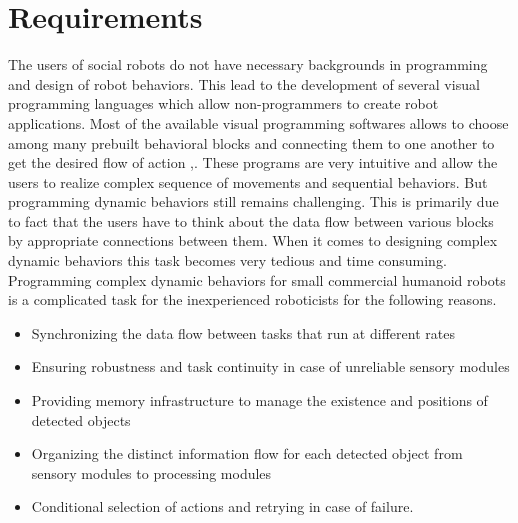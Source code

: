 {\section{Requirements}
The users of social robots do not have necessary backgrounds in programming and design of robot behaviors. This lead to the development of several visual programming languages which allow non-programmers to create robot applications. Most of the available visual programming softwares allows to choose among many prebuilt behavioral blocks and connecting them to one another to get the desired flow of action \cite{MSRS4},\cite{Choregraphe}. These programs are very intuitive and allow the users to realize complex sequence of movements and sequential behaviors. But programming dynamic behaviors still remains challenging. This is primarily due to fact that the users have to think about the data flow between various blocks by appropriate connections between them. When it comes to designing complex dynamic behaviors this task becomes very tedious and time consuming. 
Programming complex dynamic behaviors for small commercial humanoid robots is a complicated task for the inexperienced roboticists\cite{berenz2014targets} for the following reasons.
\begin{itemize}
\item Synchronizing the data flow between tasks that run at different rates
\item Ensuring robustness and task continuity in case of unreliable sensory modules
\item Providing memory infrastructure to manage the existence and positions of detected objects
\item Organizing the distinct information flow for each detected object from sensory modules to processing modules
\item Conditional selection of actions and retrying in case of failure. 
\end{itemize}
}
